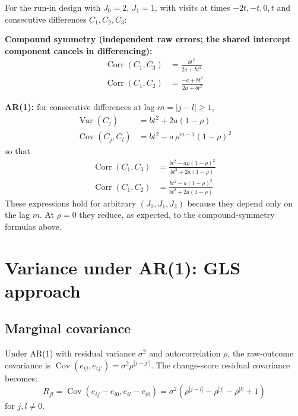 \documentclass[
  11pt,
]{article}
\begin{document}
For the run-in design with \(J_0 = 2\), \(J_1 = 1\), with
visits at times \(-2t, -t, 0, t\) and consecutive
differences \(C_1, C_2, C_3\):

\textbf{Compound symmetry (independent raw errors; the shared
intercept component cancels in differencing):}
\begin{align}
  \mathop{\mathrm{Corr}}(C_1, C_3) &= \frac{bt^2}{2a + bt^2} \\
  \mathop{\mathrm{Corr}}(C_1, C_2) &= \frac{-a + bt^2}{2a + bt^2}
\end{align}

\textbf{AR(1):} for consecutive differences at lag
\(m = |j - l| \ge 1\),
\begin{align}
  \mathop{\mathrm{Var}}(C_j) &= bt^2 + 2a(1 - \rho) \\
  \mathop{\mathrm{Cov}}(C_j, C_l) &= bt^2 - a\,\rho^{m-1}(1 - \rho)^2
\end{align}
so that
\begin{align}
  \mathop{\mathrm{Corr}}(C_1, C_3) &=
    \frac{bt^2 - a\rho(1 - \rho)^2}
         {bt^2 + 2a(1 - \rho)} \\
  \mathop{\mathrm{Corr}}(C_1, C_2) &=
    \frac{bt^2 - a(1 - \rho)^2}
         {bt^2 + 2a(1 - \rho)}
\end{align}
These expressions hold for arbitrary \((J_0, J_1, J_2)\)
because they depend only on the lag \(m\). At \(\rho = 0\)
they reduce, as expected, to the compound-symmetry
formulas above.

\section{Variance under AR(1): GLS approach}\label{variance-under-ar1-gls-approach}

\subsection{Marginal covariance}\label{marginal-covariance}

Under AR(1) with residual variance \(\sigma^2\) and
autocorrelation \(\rho\), the raw-outcome covariance is
\(\mathop{\mathrm{Cov}}(e_{ij}, e_{ij'}) = \sigma^2 \rho^{|j-j'|}\).
The change-score residual covariance becomes:
\begin{equation}
  R_{jl} = \mathop{\mathrm{Cov}}(e_{ij} - e_{i0}, e_{il} - e_{i0})
  = \sigma^2(\rho^{|j-l|} - \rho^{|j|} - \rho^{|l|} + 1)
\end{equation}
for \(j, l \ne 0\).
\end{document}
